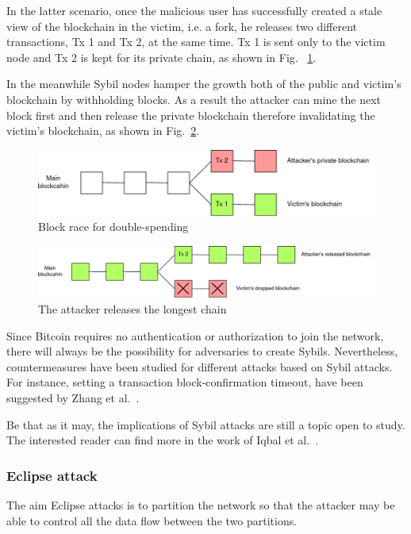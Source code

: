 \documentclass[12pt, letterpaper, twoside]{article}
\begin{document}
In the latter scenario, once the malicious user has successfully created a stale view of the blockchain in the victim, i.e. a fork, he releases two different transactions, Tx 1 and Tx 2, at the same time. Tx 1 is sent only to the victim node and Tx 2 is kept for its private chain, as shown in Fig. ~\ref{fig:race1}.

In the meanwhile Sybil nodes hamper the growth both of the public and victim's blockchain by withholding blocks. As a result the attacker can mine the next block first and then release the private blockchain therefore invalidating the victim's blockchain, as shown in Fig.~\ref{fig:race2}.

\begin{figure}[h!]
	\includegraphics[width=.9\textwidth]{pict/blockrace1.png}
	\centering
	\caption{Block race for double-spending}
	\label{fig:race1}
\end{figure}

\begin{figure}[h!]
	\includegraphics[width=.9\textwidth]{pict/blockrace2.png}
	\centering
	\caption{The attacker releases the longest chain}
	\label{fig:race2}
\end{figure}

Since Bitcoin requires no authentication or authorization to join the network, there will always be the possibility for adversaries to create Sybils. Nevertheless, countermeasures have been studied for different attacks based on Sybil attacks. For instance, setting a transaction block-confirmation timeout, have been suggested by Zhang et al.~\cite{zhang-sybil-mitigations}.

Be that as it may, the implications of Sybil attacks are still a topic open to study. The interested reader can find more in the work of Iqbal et al.~\cite{iqbal-sybil}.

\subsubsection{Eclipse attack}\label{sec:eclipse}
The aim Eclipse attacks is to partition the network so that the attacker may be able to control all the data flow between the two partitions.
\end{document}

